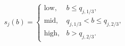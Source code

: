 \begin{equation}
s_j(b)=\begin{cases}
\mathrm{low}, & b\le q_{j,1/3},\\
\mathrm{mid}, & q_{j,1/3}<b\le q_{j,2/3},\\
\mathrm{high}, & b>q_{j,2/3}.
\end{cases}
\label{eq:tertile_discretization}
\tag{4}
\end{equation}
